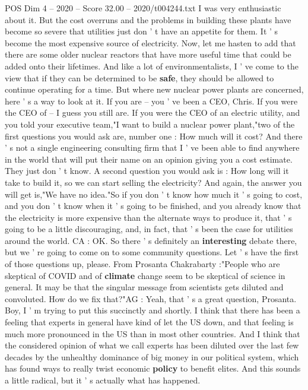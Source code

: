 \begin{textsample}{POS Dim 4 – 2020 – Score 32.00 – 2020/t004244.txt}
I was very enthusiastic about it.
But the cost overruns and the problems in building these plants have become so severe that utilities just don ' t have an appetite for them.
It ' s become the most expensive source of electricity.
Now, let me hasten to add that there are some older nuclear reactors that have more useful time that could be added onto their lifetimes.
And like a lot of environmentalists, I ' ve come to the view that if they can be determined to be \textbf{safe}, they should be allowed to continue operating for a time.
But where new nuclear power plants are concerned, here ' s a way to look at it.
If you are -- you ' ve been a CEO, Chris.
If you were the CEO of -- I guess you still are.
If you were the CEO of an electric utility, and you told your executive team,"I want to build a nuclear power plant,"two of the first questions you would ask are, number one : How much will it cost?
And there ' s not a single engineering consulting firm that I ' ve been able to find anywhere in the world that will put their name on an opinion giving you a cost estimate.
They just don ' t know.
A second question you would ask is : How long will it take to build it, so we can start selling the electricity?
And again, the answer you will get is,"We have no idea."So if you don ' t know how much it ' s going to cost, and you don ' t know when it ' s going to be finished, and you already know that the electricity is more expensive than the alternate ways to produce it, that ' s going to be a little discouraging, and, in fact, that ' s been the case for utilities around the world.
CA : OK.
So there ' s definitely an \textbf{interesting} debate there, but we ' re going to come on to some community questions.
Let ' s have the first of those questions up, please.
From Prosanta Chakrabarty :"People who are skeptical of COVID and of \textbf{climate} change seem to be skeptical of science in general.
It may be that the singular message from scientists gets diluted and convoluted.
How do we fix that?"AG : Yeah, that ' s a great question, Prosanta.
Boy, I ' m trying to put this succinctly and shortly.
I think that there has been a feeling that experts in general have kind of let the US down, and that feeling is much more pronounced in the US than in most other countries.
And I think that the considered opinion of what we call experts has been diluted over the last few decades by the unhealthy dominance of big money in our political system, which has found ways to really twist economic \textbf{policy} to benefit elites.
And this sounds a little radical, but it ' s actually what has happened.

\end{textsample}
